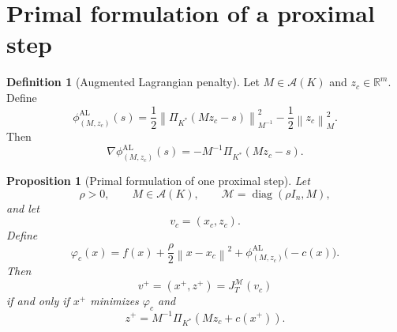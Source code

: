 \documentclass[a4paper,11pt]{book}
\theoremstyle{plain}
\newtheorem{proposition}[theorem]{Proposition}
\theoremstyle{definition}
\newtheorem{definition}[theorem]{Definition}
\theoremstyle{remark}
\numberwithin{equation}{chapter}
\numberwithin{algorithm}{chapter}
\newcommand{\R}{\mathbb{R}}
\newcommand{\proj}[2]{\Pi_{#2}\!\left(#1\right)}
\newcommand{\norm}[1]{\left\|#1\right\|}
\newcommand{\diag}{\operatorname{diag}}
\begin{document}
	\section{Primal formulation of a proximal step}
	
	\begin{definition}[Augmented Lagrangian penalty]
		Let \(M\in\mathcal A(K)\) and \(z_c\in\R^m\). Define
		\begin{equation}
			\phi^{\mathrm{AL}}_{(M,z_c)}(s)
			=
			\frac12
			\norm{
				\proj{Mz_c-s}{K^*}
			}_{M^{-1}}^2
			-
			\frac12\norm{z_c}_M^2.
			\label{eq:augmented-lagrangian-penalty}
		\end{equation}
		Then
		\begin{equation}
			\nabla
			\phi^{\mathrm{AL}}_{(M,z_c)}(s)
			=
			-
			M^{-1}
			\proj{Mz_c-s}{K^*}.
		\end{equation}
	\end{definition}
	
	\begin{proposition}[Primal formulation of one proximal step]
		Let
		\[
		\rho>0,
		\qquad
		M\in\mathcal A(K),
		\qquad
		\mathcal M=\diag(\rho I_n,M),
		\]
		and let
		\[
		v_c=(x_c,z_c).
		\]
		Define
		\begin{equation}
			\varphi_c(x)
			=
			f(x)
			+
			\frac{\rho}{2}\norm{x-x_c}^2
			+
			\phi^{\mathrm{AL}}_{(M,z_c)}\bigl(-c(x)\bigr).
			\label{eq:primal-proximal-objective}
		\end{equation}
		Then
		\[
		v^+=(x^+,z^+)=J_T^{\mathcal M}(v_c)
		\]
		if and only if \(x^+\) minimizes \(\varphi_c\) and
		\begin{equation}
			z^+
			=
			M^{-1}
			\proj{Mz_c+c(x^+)}{K^*}.
			\label{eq:recovered-dual-variable}
		\end{equation}
	\end{proposition}
	
\end{document}
